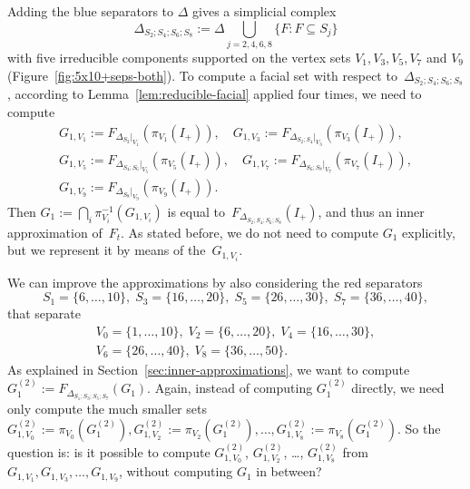 \documentclass[aos,noinfoline]{imsart}
\newcommand{\face}{F}
\theoremstyle{remark}
\theoremstyle{definition}
\begin{document}
Adding the blue separators to $\Delta$ gives a simplicial complex
\begin{equation*}
\Delta_{S_{2};S_{4};S_{6};S_{8}}:=\Delta\bigcup_{j=2,4,6,8}\{F:F\subseteq S_{j}\}
\end{equation*}
with five irreducible components supported on the vertex sets $V_{1},V_{3},V_{5},V_{7}$ and $V_{9}$
(Figure~\ref{fig:5x10+seps-both}).  To compute a facial set with respect to~$\Delta_{S_{2};S_{4};S_{6};S_{8}}$,
according to Lemma~\ref{lem:reducible-facial} applied four times, we need to compute
\begin{gather*}
  G_{1,V_{1}}:=\face_{\Delta_{S_{2}}|_{V_{1}}}(\pi_{V_{1}}(I_{+})), \quad
  G_{1,V_{3}}:=\face_{\Delta_{S_{2};S_{4}}|_{V_{3}}}(\pi_{V_{3}}(I_{+})), \\
  G_{1,V_{5}}:=\face_{\Delta_{S_{4};S_{6}}|_{V_{5}}}(\pi_{V_{5}}(I_{+})), \quad
  G_{1,V_{7}}:=\face_{\Delta_{S_{6};S_{8}}|_{V_{7}}}(\pi_{V_{7}}(I_{+})), \\
  G_{1,V_{9}}:=\face_{\Delta_{S_{8}}|_{V_{9}}}(\pi_{V_{9}}(I_{+})).
\end{gather*}
Then $G_{1}:=\bigcap_{i}\pi_{V_{i}}^{-1}(G_{1,V_{i}})$ is equal to~$\face_{\Delta_{S_{2};S_{4};S_{6};S_{8}}}(I_{+})$,
and thus an inner approximation of~$F_{t}$. As stated before, we do not need to compute $G_{1}$ explicitly, but we represent it by
means of the~$G_{1,V_{i}}$.  

We can improve the approximations by also considering the red separators 
\begin{equation*}
  S_{1}=\{6,\dots,10\},\;S_{3}=\{16,\dots,20\},\;S_{5}=\{26,\dots,30\},\;S_{7}=\{36,\dots,40\},
\end{equation*}
that separate
\begin{gather*}
  V_{0}=\{1,\dots,10\},\; V_{2}=\{6,\dots,20\},\; V_{4}=\{16,\dots,30\}, \\ %
  V_{6}=\{26,\dots,40\},\; V_{8}=\{36,\dots,50\}.
\end{gather*}
As explained in Section~\ref{sec:inner-approximations},
we want to compute $G^{(2)}_{1} := \face_{\Delta_{S_{1};S_{3};S_{5};S_{7}}}(G_{1})$.  Again, instead of computing $G^{(2)}_{1}$
directly, we need only compute  the much smaller sets
$G^{(2)}_{1,V_{0}}:=\pi_{V_{0}}(G^{(2)}_{1}),G^{(2)}_{1,V_{2}}:=\pi_{V_{2}}(G^{(2)}_{1}),\dots,G^{(2)}_{1,V_{8}}:=\pi_{V_{8}}(G^{(2)}_{1})$.
So the question is: is it possible to compute $G^{(2)}_{1,V_{0}}$, $G^{(2)}_{1,V_{2}}$, \dots, $G^{(2)}_{1,V_{8}}$ from
$G_{1,V_{1}},G_{1,V_{3}},\dots,G_{1,V_{9}}$, without computing $G_{1}$ in between?
\end{document}
